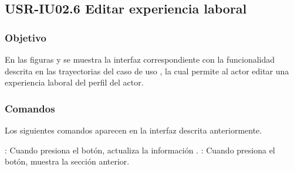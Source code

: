 \clearpage
\subsection{USR-IU02.6 Editar experiencia laboral}

\subsubsection{Objetivo}
En las figuras  y  se muestra la interfaz correspondiente con la funcionalidad descrita en las
trayectorias del caso de uso  , la cual permite al actor editar una experiencia laboral del perfil del actor.

\subsubsection{Comandos}
Los siguientes comandos aparecen en la interfaz descrita anteriormente.

\Titem {} : Cuando presiona el botón, actualiza la información .
\Titem {} : Cuando presiona el botón, muestra la sección anterior.%



\clearpage
